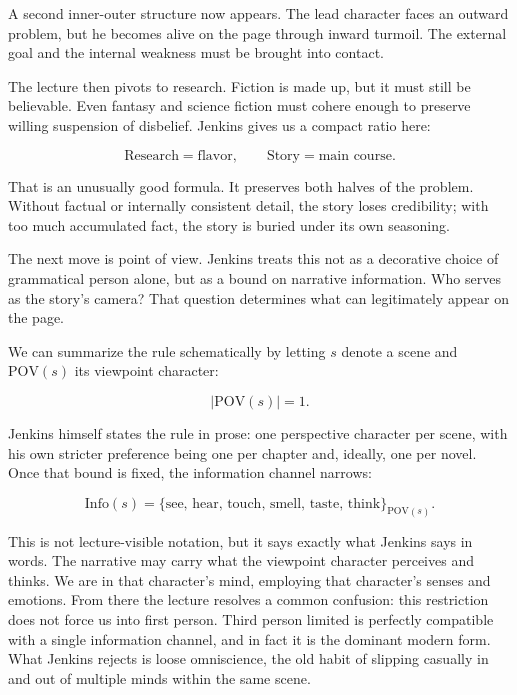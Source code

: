 A second inner-outer structure now appears. The lead character faces an outward problem, but he becomes alive on the page through inward turmoil. The external goal and the internal weakness must be brought into contact.

The lecture then pivots to research. Fiction is made up, but it must still be believable. Even fantasy and science fiction must cohere enough to preserve willing suspension of disbelief. Jenkins gives us a compact ratio here:

\begin{equation}
\text{Research}=\text{flavor},\qquad \text{Story}=\text{main course}.
\end{equation}

That is an unusually good formula. It preserves both halves of the problem. Without factual or internally consistent detail, the story loses credibility; with too much accumulated fact, the story is buried under its own seasoning.

The next move is point of view. Jenkins treats this not as a decorative choice of grammatical person alone, but as a bound on narrative information. Who serves as the story's camera? That question determines what can legitimately appear on the page.

We can summarize the rule schematically by letting \(s\) denote a scene and \(\mathrm{POV}(s)\) its viewpoint character:

\begin{equation}
|\mathrm{POV}(s)|=1.
\end{equation}

Jenkins himself states the rule in prose: one perspective character per scene, with his own stricter preference being one per chapter and, ideally, one per novel. Once that bound is fixed, the information channel narrows:

\begin{equation}
\mathrm{Info}(s)=\{\text{see, hear, touch, smell, taste, think}\}_{\mathrm{POV}(s)}.
\end{equation}

This is not lecture-visible notation, but it says exactly what Jenkins says in words. The narrative may carry what the viewpoint character perceives and thinks. We are in that character's mind, employing that character's senses and emotions. From there the lecture resolves a common confusion: this restriction does not force us into first person. Third person limited is perfectly compatible with a single information channel, and in fact it is the dominant modern form. What Jenkins rejects is loose omniscience, the old habit of slipping casually in and out of multiple minds within the same scene.

